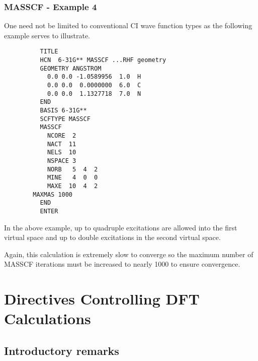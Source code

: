 \documentclass[11pt,fleqn]{article}
\begin{document}
\subsubsection{MASSCF - Example 4}
One need not be limited to conventional CI wave function types as the 
following example serves to illustrate.

{
\footnotesize
\begin{verbatim}
          TITLE
          HCN  6-31G** MASSCF ...RHF geometry 
          GEOMETRY ANGSTROM
            0.0 0.0 -1.0589956  1.0  H
            0.0 0.0  0.0000000  6.0  C
            0.0 0.0  1.1327718  7.0  N
          END
          BASIS 6-31G**
          SCFTYPE MASSCF
          MASSCF
            NCORE  2
            NACT  11
            NELS  10
            NSPACE 3
            NORB   5  4  2
            MINE   4  0  0
            MAXE  10  4  2
	    MAXMAS 1000
          END
          ENTER
\end{verbatim}
}

In the above example, up to quadruple excitations are allowed into the 
first virtual space and up to double excitations in the second virtual 
space.

Again, this calculation is extremely slow to converge so the maximum number of
MASSCF iterations must be increased to nearly 1000 to ensure convergence.

\clearpage

\section[Directives Controlling DFT Calculations]{Directives Controlling DFT Calculations}

\subsection{Introductory remarks}
\end{document}
